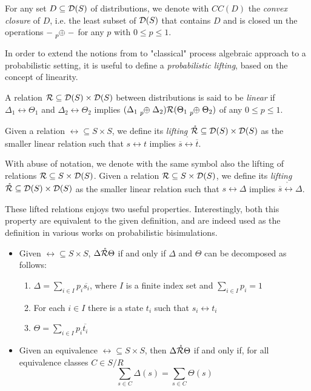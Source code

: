 For any set $D \subseteq \mathcal{D}(S)$ of distributions, we denote with $CC(D)$ the \textit{convex closure} of $D$, i.e. the least subset of $\mathcal{D}(S)$ that contains $D$ and is closed un the operations $ - \psum{p} - $ for any $p$ with $0 \leq p \leq 1$.


In order to extend the notions from to "classical" process algebraic approach to a probabilistic setting, it is useful to define a \textit{probabilistic lifting}, based on the concept of linearity.

A relation $\mathcal{R} \subseteq \mathcal{D}(S) \times \mathcal{D}(S)$  between distributions is said to be \textit{linear} if $\Delta_1 \rel \Theta_1$ and $\Delta_2 \rel \Theta_2$ implies $(\Delta_1 \psum{p} \Delta_2) \rel (\Theta_1 \psum{p} \Theta_2)$ of any $0 \leq p \leq 1$.

Given a relation $\rel \subseteq S \times S$, we define its \textit{lifting} $\mathring{\mathcal{R}} \subseteq \mathcal{D}(S) \times \mathcal{D}(S)$ as the smaller linear relation such that $s \rel t$ implies $\overline{s} \mathring{\rel} \overline{t}$.

With abuse of notation, we denote with the same symbol also the lifting of relations $\mathcal{R} \subseteq S \times \mathcal{D}(S)$. Given a relation $\mathcal{R} \subseteq S \times \mathcal{D}(S)$, we define its \textit{lifting} $\mathring{\mathcal{R}} \subseteq \mathcal{D}(S) \times \mathcal{D}(S)$ as the smaller linear relation such that $s \rel \Delta$ implies $\overline{s} \mathring{\rel} \Delta$.


These lifted relations enjoys two useful properties. Interestingly, both this property are equivalent to the given definition, and are indeed used as the definition in various works on probabilistic bisimulations. \begin{itemize}
\item Given $\rel \subseteq S \times S$, $\Delta \mathring{\mathcal{R}} \Theta$ if and only if $\Delta$ and $\Theta$ can be decomposed as follows: \begin{enumerate}
\item $\Delta = \sum_{i \in I} p_i \overline{s_i}$, where $I$ is a finite index set and $\sum_{i \in I}p_i = 1$
\item For each $i \in I$ there is a state $t_i$ such that $s_i \rel t_i$
\item $\Theta = \sum_{i\in I}p_i\overline{t_i}$ 
\end{enumerate}
\item Given an equivalence $\rel \subseteq S \times S$, then $\Delta \mathring{\mathcal{R}} \Theta$ if and only if, for all equivalence classes $C \in S/R$
\[\sum_{s\in C} \Delta(s) = \sum_{s\in C} \Theta(s)\]
\end{itemize}

